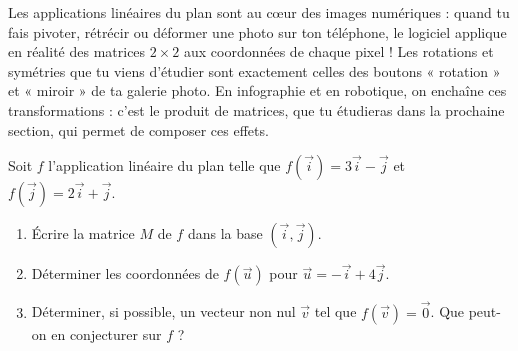 \documentclass[11pt]{article}
\begin{document}
\begin{savaistu}
Les applications linéaires du plan sont au cœur des images numériques : quand tu fais pivoter, rétrécir ou déformer une photo sur ton téléphone, le logiciel applique en réalité des matrices $2\times 2$ aux coordonnées de chaque pixel ! Les rotations et symétries que tu viens d'étudier sont exactement celles des boutons « rotation » et « miroir » de ta galerie photo. En infographie et en robotique, on enchaîne ces transformations : c'est le produit de matrices, que tu étudieras dans la prochaine section, qui permet de composer ces effets.
\end{savaistu}

\begin{exercice}
Soit $f$ l'application linéaire du plan telle que $f(\vec{i}) = 3\vec{i}-\vec{j}$ et $f(\vec{j}) = 2\vec{i}+\vec{j}$.
\begin{enumerate}
\item Écrire la matrice $M$ de $f$ dans la base $(\vec{i},\vec{j})$.
\item Déterminer les coordonnées de $f(\vec{u})$ pour $\vec{u} = -\vec{i}+4\vec{j}$.
\item Déterminer, si possible, un vecteur non nul $\vec{v}$ tel que $f(\vec{v}) = \vec{0}$. Que peut-on en conjecturer sur $f$ ?
\end{enumerate}
\end{exercice}
\end{document}
